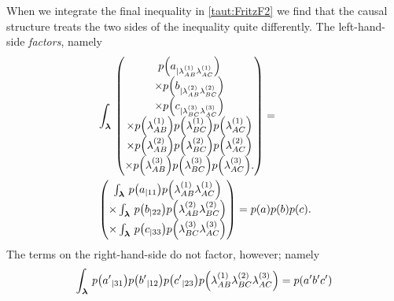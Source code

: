 When we integrate the final inequality in \cref{taut:FritzF2} we find that the causal structure treats the two sides of the inequality quite differently. The left-hand-side \emph{factors}, namely
\begin{align*}
&\int_{\setlambda}\,
\begin{pmatrix}
\p{a_{|\lambda_{AB}^{(1)}\lambda_{AC}^{(1)}}}
\\\times \p{b_{|\lambda_{AB}^{(2)}\lambda_{BC}^{(2)}}}
\\\times \p{c_{|\lambda_{BC}^{(3)}\lambda_{AC}^{(3)}}}
\\\times \p{\lambda_{AB}^{(1)}}\p{\lambda_{BC}^{(1)}} \p{\lambda_{AC}^{(1)}}
\\\times \p{\lambda_{AB}^{(2)}}\p{\lambda_{BC}^{(2)}} \p{\lambda_{AC}^{(2)}}
\\\times \p{\lambda_{AB}^{(3)}}\p{\lambda_{BC}^{(3)}} \p{\lambda_{AC}^{(3)}}.
\end{pmatrix}=
\\&\begin{pmatrix}
\int_{\setlambda}\,\p{a_{|11}}\p{\lambda_{AB}^{(1)}\lambda_{AC}^{(1)}}
\\\times \int_{\setlambda}\,\p{b_{|22}}\p{\lambda_{AB}^{(2)}\lambda_{BC}^{(2)}}
\\\times \int_{\setlambda}\,\p{c_{|33}}\p{\lambda_{BC}^{(3)}\lambda_{AC}^{(3)}}
\end{pmatrix}=\p{a}\p{b}\p{c}.
\end{align*}
The terms on the right-hand-side do not factor, however; namely
\begin{align*}
\int_{\setlambda}\,\p{{a'}_{|31}}\p{{b'}_{|12}}\p{{c'}_{|23}}\p{\lambda_{AB}^{(1)}\lambda_{BC}^{(2)}\lambda_{AC}^{(3)}}=\p{a' b' c'}
\end{align*}
